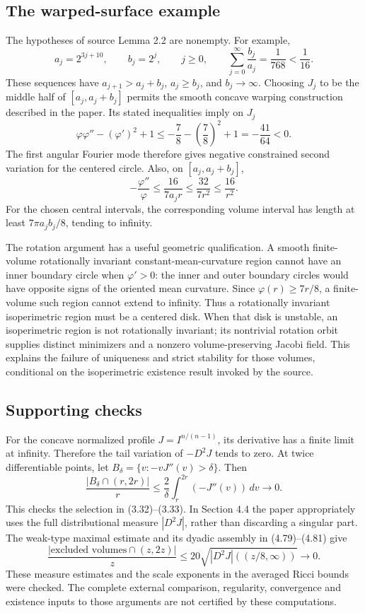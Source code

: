 \documentclass[10pt]{article}
\begin{document}
\subsection*{The warped-surface example}
The hypotheses of source Lemma 2.2 are nonempty. For example, \[a_j=2^{3j+10},\qquad b_j=2^j,\qquad j\geq0,
 \qquad
 \sum_{j=0}^\infty\frac{b_j}{a_j}=\frac1{768}<\frac1{16}.\] These sequences have \(a_{j+1}>a_j+b_j\), \(a_j\geq b_j\), and \(b_j\to\infty\). Choosing \(J_j\) to be the middle half of \([a_j,a_j+b_j]\) permits the smooth concave warping construction described in the paper. Its stated inequalities imply on \(J_j\) \[\varphi\varphi''-(\varphi')^2+1
 \leq -\frac78-\left(\frac78\right)^2+1
 =-\frac{41}{64}<0 .\] The first angular Fourier mode therefore gives negative constrained second variation for the centered circle. Also, on \([a_j,a_j+b_j]\), \[-\frac{\varphi''}{\varphi}
 \leq\frac{16}{7a_jr}
 \leq\frac{32}{7r^2}\leq\frac{16}{r^2}.\] For the chosen central intervals, the corresponding volume interval has length at least \(7\pi a_jb_j/8\), tending to infinity.\par
The rotation argument has a useful geometric qualification. A smooth finite-volume rotationally invariant constant-mean-curvature region cannot have an inner boundary circle when \(\varphi'>0\): the inner and outer boundary circles would have opposite signs of the oriented mean curvature. Since \(\varphi(r)\geq7r/8\), a finite-volume such region cannot extend to infinity. Thus a rotationally invariant isoperimetric region must be a centered disk. When that disk is unstable, an isoperimetric region is not rotationally invariant; its nontrivial rotation orbit supplies distinct minimizers and a nonzero volume-preserving Jacobi field. This explains the failure of uniqueness and strict stability for those volumes, conditional on the isoperimetric existence result invoked by the source.\par
\subsection*{Supporting checks}
For the concave normalized profile \(J=I^{n/(n-1)}\), its derivative has a finite limit at infinity. Therefore the tail variation of \(-D^2J\) tends to zero. At twice differentiable points, let \(B_\delta=\{v:-vJ''(v)>\delta\}\). Then \[\frac{|B_\delta\cap(r,2r)|}{r}
 \leq \frac2\delta\int_r^{2r}(-J''(v))\,dv\longrightarrow0 .\] This checks the selection in (3.32)–(3.33). In Section 4.4 the paper appropriately uses the full distributional measure \(|D^2J|\), rather than discarding a singular part. The weak-type maximal estimate and its dyadic assembly in (4.79)–(4.81) give \[\frac{|\text{excluded volumes}\cap(z,2z)|}{z}
 \leq20\sqrt{|D^2J|((z/8,\infty))}\longrightarrow0 .\] These measure estimates and the scale exponents in the averaged Ricci bounds were checked. The complete external comparison, regularity, convergence and existence inputs to those arguments are not certified by these computations.\par
\end{document}
